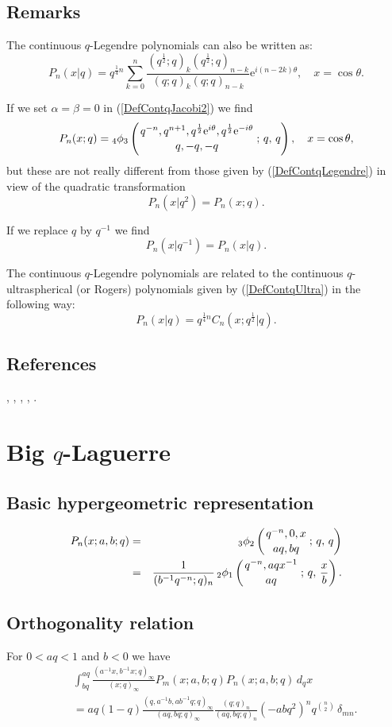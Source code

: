 \documentclass[envcountchap,graybox]{svmono}
\newcounter{rom}
\newcommand{\qhyp}[5]{\mbox{}_{#1}{\phi}_{#2}
\left(\genfrac{}{}{0pt}{}{#3}{#4}\,;\,q,\,#5\right)}
\newcommand{\e}{\textrm{e}}
\begin{document}
\subsection*{Remarks} 
The continuous $q$-Legendre polynomials can also be written
as:
$$P_n(x|q)=q^{\frac{1}{4}n}\sum_{k=0}^n
\frac{(q^{\frac{1}{2}};q)_k(q^{\frac{1}{2}};q)_{n-k}}{(q;q)_k(q;q)_{n-k}}
\e^{i(n-2k)\theta},\quad x=\cos\theta.$$

\noindent
If we set $\alpha=\beta=0$ in (\ref{DefContqJacobi2}) we find
$$P_n(x;q)=\qhyp{4}{3}{q^{-n},q^{n+1},q^{\frac{1}{2}}\e^{i\theta},q^{\frac{1}{2}}\e^{-i\theta}}
{q,-q,-q}{q},\quad x=\cos\theta,$$
but these are not really different from those given by (\ref{DefContqLegendre})
in view of the quadratic transformation
$$P_n(x|q^2)=P_n(x;q).$$

\noindent
If we replace $q$ by $q^{-1}$ we find
$$P_n(x|q^{-1})=P_n(x|q).$$

\noindent
The continuous $q$-Legendre polynomials are related to the continuous
$q$-ultra\-spher\-i\-cal (or Rogers) polynomials given by (\ref{DefContqUltra}) in
the following way:
$$P_n(x|q)=q^{\frac{1}{4}n}C_n(x;q^{\frac{1}{2}}|q).$$

\subsection*{References}
\cite{KoelinkE}, \cite{Koelink94}, \cite{Koorn89I}, \cite{Koorn90II},
\cite{Koorn93}.


\section{Big $q$-Laguerre}
\par\setcounter{equation}{0}

\subsection*{Basic hypergeometric representation}
\begin{eqnarray}
\label{DefBigqLaguerre}
P_n(x;a,b;q)&=&\qhyp{3}{2}{q^{-n},0,x}{aq,bq}{q}\\
&=&\frac{1}{(b^{-1}q^{-n};q)_n}\,\qhyp{2}{1}{q^{-n},aqx^{-1}}{aq}{\frac{x}{b}}.\nonumber
\end{eqnarray}

\subsection*{Orthogonality relation}
For $0<aq<1$ and $b<0$ we have
\begin{eqnarray}
\label{OrtBigqLaguerre}
& &\int_{bq}^{aq}\frac{(a^{-1}x,b^{-1}x;q)_{\infty}}{(x;q)_{\infty}}
P_m(x;a,b;q)P_n(x;a,b;q)\,d_qx\nonumber\\
& &{}=aq(1-q)\frac{(q,a^{-1}b,ab^{-1}q;q)_{\infty}}
{(aq,bq;q)_{\infty}}\frac{(q;q)_n}{(aq,bq;q)_n}(-abq^2)^nq^{\binom{n}{2}}\,\delta_{mn}.
\end{eqnarray}
\end{document}
